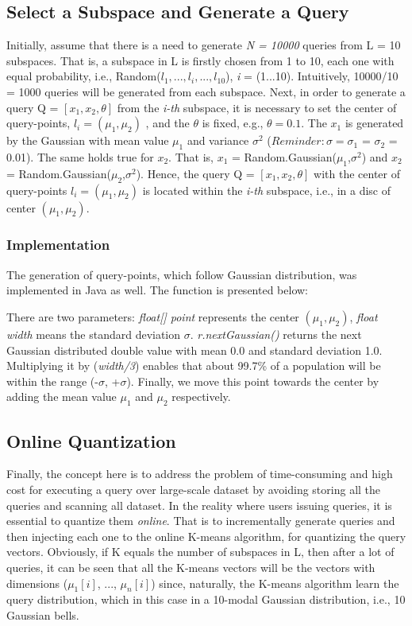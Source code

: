 \documentclass{lmproj}
\begin{document}
\subsection{Select a Subspace and Generate a Query}
Initially, assume that there is a need to generate \textit{N = 10000} queries from L = 10 subspaces. That is, a subspace in L is firstly chosen from 1 to 10, each one with equal probability, i.e., Random($ l_1,...,l_{i},...,l_{10} $), \textit{i} = (1...10). Intuitively, 10000/10 = 1000 queries will be generated from each subspace. Next, in order to generate a query Q = $ [x_1,x_2,\theta] $ from the \textit{i-th} subspace, it is necessary to set the center of query-points, $ l_i=(\mu_1,\mu_2) $ , and the $ \theta $ is fixed, e.g., $ \theta=0.1 $. The  $ x_1 $ is generated by the Gaussian with mean value $ \mu_1 $ and variance $ \sigma^2 $ ($ Reminder: \sigma = \sigma_1 $ = $ \sigma_2 $ = 0.01). The same holds true for $ x_2 $. That is,  $ x_1 $ = Random.Gaussian($ \mu_1 $,$ \sigma^2 $) and  $ x_2 $ = Random.Gaussian($ \mu_2 $,$ \sigma^2 $). Hence, the query Q = $ [x_1,x_2,\theta] $ with the center of query-points $ l_i=(\mu_1,\mu_2) $ is located within the \textit{i-th} subspace, i.e., in a disc of center $ (\mu_1,\mu_2) $.

\subsubsection{Implementation}
The generation of query-points, which follow Gaussian distribution, was implemented in Java as well. The function is presented below:


There are two parameters: \textit{float[] point} represents the center $ (\mu_1,\mu_2) $, \textit{float width} means the standard deviation  $ \sigma $. \textit{r.nextGaussian()} returns the next Gaussian distributed double value with mean 0.0 and standard deviation 1.0. Multiplying it by (\textit{width/3}) enables that about 99.7\% of a population will be within the range (-$ \sigma $, +$ \sigma $). Finally, we move this point towards the center by adding the mean value $ \mu_1 $ and $ \mu_2 $ respectively. 



\subsection{Online Quantization}
Finally, the concept here is to address the problem of time-consuming and high cost for executing a query over large-scale dataset by avoiding storing all the queries and scanning all dataset. In the reality where users issuing queries, it is essential to quantize them \textit{online}. That is to incrementally generate queries and then injecting each one to the online K-means algorithm, for quantizing the query vectors. Obviously, if K equals the number of subspaces in L, then after a lot of queries, it can be seen that all the K-means vectors will be the vectors with dimensions ($ \mu_1[i] $, ..., $ \mu_n[i] $) since, naturally, the K-means algorithm learn the query distribution, which in this case in a 10-modal Gaussian distribution, i.e., 10 Gaussian bells.
\end{document}
